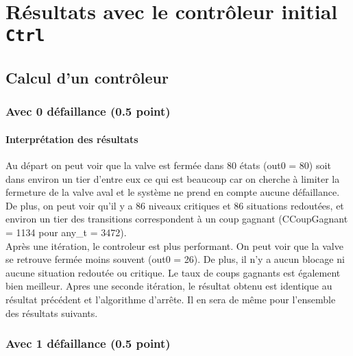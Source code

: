 \documentclass[a4paper]{book}
\begin{document}
\section{Résultats avec le contrôleur initial {\tt Ctrl}}
\subsection{Calcul d'un contrôleur}
\subsubsection{Avec 0 défaillance (0.5 point)}



%
%
\paragraph{Interprétation des résultats}
Au départ on peut voir que la valve est fermée dans 80 états (out0 = 80) 
soit dans environ un tier d'entre eux ce qui est beaucoup car on cherche à limiter la fermeture de la valve aval et le système ne prend en compte aucune défaillance. 
De plus, on peut voir qu'il y a 86 niveaux critiques et 86 situations redoutées, et environ un tier des transitions correspondent à un coup gagnant (CCoupGagnant = 1134 pour any\_t = 3472).\\
Après une itération, le controleur est plus performant. On peut voir que la valve se retrouve fermée moins souvent (out0 = 26). De plus, il n'y a aucun blocage 
ni aucune situation redoutée ou critique. Le taux de coups gagnants est également bien meilleur.
Apres une seconde itération, le résultat obtenu est identique au résultat précédent et l'algorithme d'arrête. Il en sera de même pour l'ensemble des résultats suivants.


\subsubsection{Avec 1 défaillance (0.5 point)}




%
\end{document}
